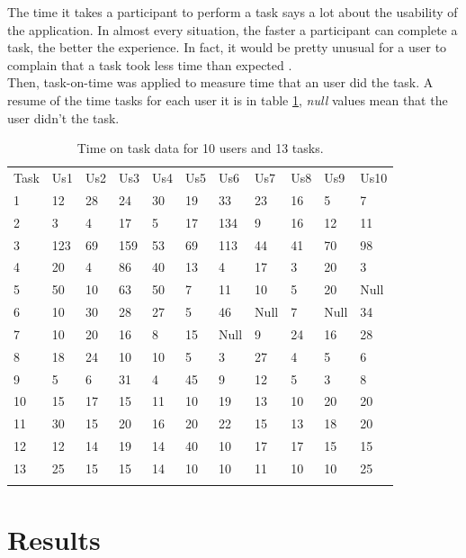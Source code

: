 The time it takes a participant to perform a task says a lot about the usability
of the application. In almost every situation, the faster a participant can
complete a task, the better the experience. In fact, it would be pretty unusual
for a user to complain that a task took less time than expected
\cite{albert2013measuring}.\\ Then, task-on-time was applied to measure time
that an user did the task. A resume of the time tasks for each user it is in
table \ref{tab:datausers}, \textit{null} values mean that the user didn't the task.
\begin{table}
\centering
\small
\captionsetup{font=footnotesize}
\caption{Time on task data for 10 users and 13 tasks. }
\label{tab:datausers}  
\begin{tabular}{lllllllllll}
\hline\noalign{\smallskip}
Task  & Us1  & Us2 & Us3 & Us4 & Us5 & Us6 & Us7 & Us8 & Us9 & Us10 \\
\noalign{\smallskip}\hline\noalign{\smallskip}
1 & 12  & 28 & 24 & 30 & 19 & 33  & 23 & 16 & 5  & 7 \\
2 & 3   & 4  & 17 & 5  & 17 & 134 & 9  & 16 & 12 & 11 \\
3 & 123 & 69 & 159& 53 & 69 & 113 & 44 & 41 & 70 & 98 \\
4 & 20  & 4  & 86 & 40 & 13 & 4   & 17 & 3  & 20 & 3 \\
5 & 50  & 10 & 63 & 50 & 7  & 11  & 10 & 5  & 20 & Null \\
6 & 10  & 30 & 28 & 27 & 5  & 46  & Null  & 7  & Null  & 34 \\
7 & 10  & 20 & 16 & 8  & 15 & Null & 9  & 24 & 16 & 28 \\
8 & 18  & 24 & 10 & 10 & 5  & 3   & 27 & 4  & 5  & 6 \\
9 & 5   & 6  & 31 & 4  & 45 & 9   & 12 & 5  & 3  & 8 \\
10 & 15 & 17 & 15 & 11 & 10 & 19  & 13 & 10 & 20 & 20 \\
11 & 30 & 15 & 20 & 16 & 20 & 22  & 15 & 13 & 18 & 20 \\
12 & 12 & 14 & 19 & 14 & 40 & 10  & 17 & 17 & 15 & 15 \\
13 & 25 & 15 & 15 & 14 & 10 & 10  & 11 & 10 & 10 & 25 \\
\noalign{\smallskip}\hline
\end{tabular}
\end{table}

\section{Results}

